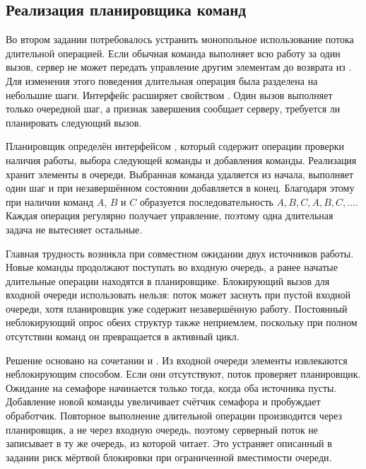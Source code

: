 \subsection{Реализация планировщика команд}

Во втором задании потребовалось устранить монопольное использование потока длительной операцией. Если обычная команда выполняет всю работу за один вызов, сервер не может передать управление другим элементам до возврата из . Для изменения этого поведения длительная операция была разделена на небольшие шаги. Интерфейс  расширяет  свойством . Один вызов выполняет только очередной шаг, а признак завершения сообщает серверу, требуется ли планировать следующий вызов.

Планировщик определён интерфейсом , который содержит операции проверки наличия работы, выбора следующей команды и добавления команды. Реализация  хранит элементы в очереди. Выбранная команда удаляется из начала, выполняет один шаг и при незавершённом состоянии добавляется в конец. Благодаря этому при наличии команд $A$, $B$ и $C$ образуется последовательность $A,B,C,A,B,C,\ldots$. Каждая операция регулярно получает управление, поэтому одна длительная задача не вытесняет остальные.

Главная трудность возникла при совместном ожидании двух источников работы. Новые команды продолжают поступать во входную очередь, а ранее начатые длительные операции находятся в планировщике. Блокирующий вызов  для входной очереди использовать нельзя: поток может заснуть при пустой входной очереди, хотя планировщик уже содержит незавершённую работу. Постоянный неблокирующий опрос обеих структур также неприемлем, поскольку при полном отсутствии команд он превращается в активный цикл.

Решение основано на сочетании  и  \cite{semaphore}. Из входной очереди элементы извлекаются неблокирующим способом. Если они отсутствуют, поток проверяет планировщик. Ожидание на семафоре начинается только тогда, когда оба источника пусты. Добавление новой команды увеличивает счётчик семафора и пробуждает обработчик. Повторное выполнение длительной операции производится через планировщик, а не через входную очередь, поэтому серверный поток не записывает в ту же очередь, из которой читает. Это устраняет описанный в задании риск мёртвой блокировки при ограниченной вместимости очереди.

